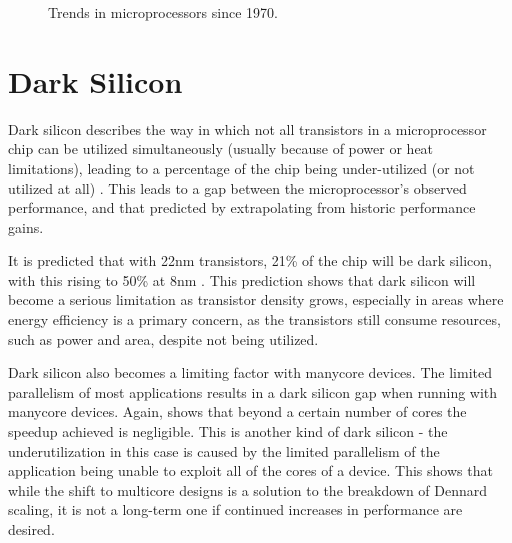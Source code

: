 \documentclass{UoYCSproject}
\begin{document}
\begin{figure}[h]
\caption{Trends in microprocessors since 1970. \cite{karlrupp}}
\label{fig:microprocessorTrends}
\end{figure}

\section{Dark Silicon}

Dark silicon describes the way in which not all transistors in a microprocessor chip can be utilized simultaneously
(usually because of power or heat limitations), leading to a percentage of the chip being under-utilized
(or not utilized at all) \cite{four-horsemen}. This leads to a gap between the microprocessor's observed performance,
and that predicted by extrapolating from historic performance gains.

It is predicted that with 22nm transistors, 21\% of the chip will be dark silicon,
with this rising to 50\% at 8nm \cite{darksilicon}. This prediction shows that dark silicon will become a serious limitation
as transistor density grows, especially in areas where energy efficiency is a primary concern, as the transistors
still consume resources, such as power and area, despite not being utilized.

Dark silicon also becomes a limiting factor with manycore devices. The limited parallelism of most applications results in a
dark silicon gap when running with manycore devices. Again, \cite{darksilicon} shows that beyond a certain number of cores the
speedup achieved is negligible. This is another kind of dark silicon - the underutilization in this case is caused by the limited
parallelism of the application being unable to exploit all of the cores of a device. This shows that while the shift to
multicore designs is a solution to the breakdown of Dennard scaling, it is not a long-term one if continued increases in
performance are desired.
\end{document}
